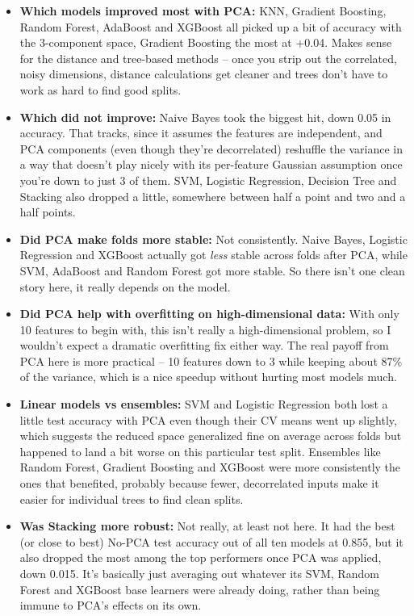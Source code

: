 \documentclass[12pt,a4paper]{article}
\begin{document}
\begin{itemize}
\item \textbf{Which models improved most with PCA:} KNN, Gradient Boosting, Random Forest, AdaBoost
and XGBoost all picked up a bit of accuracy with the 3-component space, Gradient Boosting the most at
+0.04. Makes sense for the distance and tree-based methods -- once you strip out the correlated,
noisy dimensions, distance calculations get cleaner and trees don't have to work as hard to find good
splits.
\item \textbf{Which did not improve:} Naive Bayes took the biggest hit, down 0.05 in accuracy. That
tracks, since it assumes the features are independent, and PCA components (even though they're
decorrelated) reshuffle the variance in a way that doesn't play nicely with its per-feature Gaussian
assumption once you're down to just 3 of them. SVM, Logistic Regression, Decision Tree and Stacking
also dropped a little, somewhere between half a point and two and a half points.
\item \textbf{Did PCA make folds more stable:} Not consistently. Naive Bayes, Logistic Regression and
XGBoost actually got \emph{less} stable across folds after PCA, while SVM, AdaBoost and Random Forest
got more stable. So there isn't one clean story here, it really depends on the model.
\item \textbf{Did PCA help with overfitting on high-dimensional data:} With only 10 features to begin
with, this isn't really a high-dimensional problem, so I wouldn't expect a dramatic overfitting fix
either way. The real payoff from PCA here is more practical -- 10 features down to 3 while keeping
about 87\% of the variance, which is a nice speedup without hurting most models much.
\item \textbf{Linear models vs ensembles:} SVM and Logistic Regression both lost a little test
accuracy with PCA even though their CV means went up slightly, which suggests the reduced space
generalized fine on average across folds but happened to land a bit worse on this particular test
split. Ensembles like Random Forest, Gradient Boosting and XGBoost were more consistently the ones
that benefited, probably because fewer, decorrelated inputs make it easier for individual trees to
find clean splits.
\item \textbf{Was Stacking more robust:} Not really, at least not here. It had the best (or close to
best) No-PCA test accuracy out of all ten models at 0.855, but it also dropped the most among the
top performers once PCA was applied, down 0.015. It's basically just averaging out whatever its SVM,
Random Forest and XGBoost base learners were already doing, rather than being immune to PCA's effects
on its own.
\end{itemize}
\end{document}
